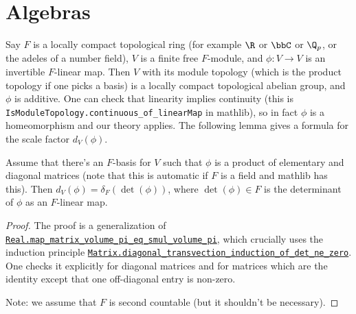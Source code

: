 \section{Algebras}

  Say $F$ is a locally compact topological ring (for example $\R$ or $\bbC$ or $\Q_p$,
  or the adeles of a number field), $V$
  is a finite free $F$-module, and $\phi:V\to V$ is an invertible $F$-linear map.
  Then $V$ with its module topology (which is the product topology if one picks a basis)
  is a locally compact topological abelian group, and $\phi$ is additive.
  One can check that linearity implies continuity (this is
  {\tt IsModuleTopology.continuous\_of\_linearMap} in mathlib),
  so in fact $\phi$ is a homeomorphism
  and our theory applies. The following lemma gives a formula for the scale factor $d_V(\phi)$.

\begin{lemma}
  \label{MeasureTheory.addEquivAddHaarChar_eq_ringHaarChar_det,
    MeasureTheory.addEquivAddHaarChar_eq_ringHaarChar_det_of_existsListTransvecEtc}
  \leanok
  Assume that there's an $F$-basis for $V$ such that $\phi$ is a product of elementary
  and diagonal matrices (note that this is automatic if $F$ is a field and mathlib
  has this). Then
  $d_V(\phi)=\delta_F(\det(\phi))$, where $\det(\phi)\in F$ is the determinant of
  $\phi$ as an $F$-linear map.
\end{lemma}
\begin{proof}
\leanok
The proof is a generalization of
\href{https://leanprover-community.github.io/mathlib4\_docs/Mathlib/MeasureTheory/Measure/Lebesgue/Basic.html\#Real.map\_matrix\_volume\_pi\_eq\_smul\_volume\_pi}
{\tt Real.map\_matrix\_volume\_pi\_eq\_smul\_volume\_pi},
which crucially uses the induction principle
\href{https://leanprover-community.github.io/mathlib4\_docs/Mathlib/LinearAlgebra/Matrix/Transvection.html\#Matrix.diagonal\_transvection\_induction\_of\_det\_ne\_zero}
{\tt Matrix.diagonal\_transvection\_induction\_of\_det\_ne\_zero}.
One checks it explicitly for diagonal matrices and for matrices which are the identity
except that one off-diagonal entry is non-zero.

Note: we assume that $F$ is second countable
(but it shouldn't be necessary).
\end{proof}

